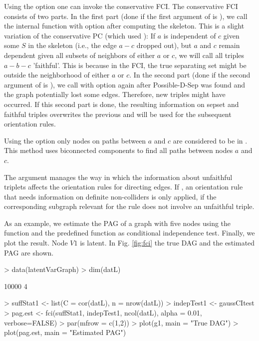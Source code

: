 \documentclass[article]{jss}
\begin{document}
Using the option  one can invoke the conservative
FCI. The conservative FCI consists of two parts. In the first part (done if
the first argument of  is ), we call the
internal function  with option  after computing the skeleton. This is a slight variation of the
conservative PC (which used ): If $a$ is
independent of $c$ given some $S$ in the skeleton (i.e., the edge $a-c$
dropped out), but $a$ and $c$ remain dependent given all subsets of
neighbors of either $a$ or $c$, we will call all triples $a-b-c$
'faithful'. This is because in the FCI, the true separating set might be
outside the neighborhood of either $a$ or $c$. In the second part (done if
the second argument of  is ), we call
 with option  again after
Possible-D-Sep was found and the graph potentially lost some
edges. Therefore, new triples might have occurred. If this second part is
done, the resulting information on sepset and faithful triples overwrites
the previous and will be used for the subsequent orientation rules.

Using the option  only nodes on paths between $a$ and $c$
are considered to be in . This method uses biconnected
components to find all paths between nodes $a$ and $c$.

The argument  manages the way in which the information
about unfaithful triplets affects the orientation rules for directing
edges. If , an orientation rule that needs
information on definite non-colliders is only applied, if the corresponding
subgraph relevant for the rule does not involve an unfaithful triple.

As an example, we estimate the PAG of a graph with five nodes using
the function  and the predefined function 
as conditional independence test. Finally, we plot the result. Node $V1$ is latent. In
Fig. \ref{fig:fci} the true DAG and the estimated PAG are shown.
          
\begin{Schunk}
\begin{Sinput}
> data(latentVarGraph)
> dim(datL)
\end{Sinput}
\begin{Soutput}
[1] 10000     4
\end{Soutput}
\begin{Sinput}
> suffStat1 <- list(C = cor(datL), n = nrow(datL))
> indepTest1 <- gaussCItest 
> pag.est <- fci(suffStat1, indepTest1, ncol(datL), alpha = 0.01, verbose=FALSE)
> par(mfrow = c(1,2))
> plot(g1, main = "True DAG")
> plot(pag.est, main = "Estimated PAG")
\end{Sinput}
\end{Schunk}
\end{document}
